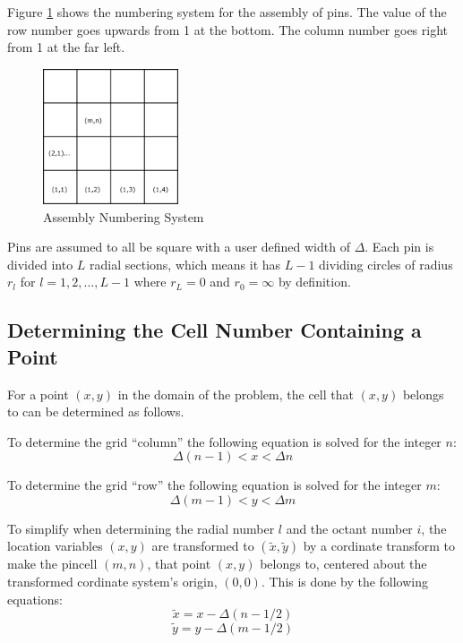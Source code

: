 \documentclass{article}
\begin{document}
Figure \ref{fig:pingrid} shows the numbering system for the assembly of pins. The value of the row number goes upwards from 1 at the bottom. The column number goes right from 1 at the far left.

\begin{figure}[h]
\begin{center}
\includegraphics[width=40mm]{pingrid.png}
\caption{Assembly Numbering System}
\end{center}
\label{fig:pingrid}
\end{figure}

Pins are assumed to all be square with a user defined width of $\Delta$. Each pin is divided into $L$ radial sections, which means it has $L-1$ dividing circles of radius $r_l$ for $l=1,2,\dots,L-1$ where $r_L=0$ and $r_0=\infty$ by definition.

\subsection{Determining the Cell Number Containing a Point}

For a point $(x,y)$ in the domain of the problem, the cell that $(x,y)$ belongs to can be determined as follows.

To determine the grid ``column'' the following equation is solved for the integer $n$:
\begin{equation}
\Delta (n-1)<x<\Delta n
\label{eq:nsolution}
\end{equation}

To determine the grid ``row'' the following equation is solved for the integer $m$:
\begin{equation}
\Delta (m-1)<y<\Delta m
\label{eq:msolution}
\end{equation}

To simplify when determining the radial number $l$ and the octant number $i$, the location variables $(x,y)$ are transformed to $(\tilde{x},\tilde{y})$ by a cordinate transform to make the pincell $(m,n)$, that point $(x,y)$ belongs to, centered about the transformed cordinate system's origin, $(0,0)$. This is done by the following equations:
\begin{equation}
\tilde{x}=x-\Delta (n-1/2)
\label{eq:xtransform}
\end{equation}
\begin{equation}
\tilde{y}=y-\Delta (m-1/2)
\label{eq:ytransform}
\end{equation}
\end{document}
